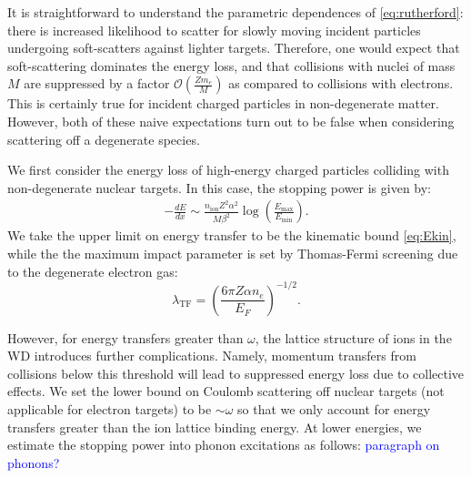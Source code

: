 \documentclass[twocolumn,showpacs,preprintnumbers,amsmath,amssymb,prd]{revtex4}
\newcommand{\OO}{\mathcal{O}}
\def\r{\right)}
\def\l{\left(}
\begin{document}
\begin{appendices}
It is straightforward to understand the parametric dependences of \eqref{eq:rutherford}: there is increased likelihood to scatter for slowly moving incident particles undergoing soft-scatters against lighter targets.
Therefore, one would expect that soft-scattering dominates the energy loss, and that collisions with nuclei of mass $M$ are suppressed by a factor $\OO\l\frac{Z m_e}{M}\r$ as compared to collisions with electrons.
This is certainly true for incident charged particles in non-degenerate matter.
However, both of these naive expectations turn out to be false when considering scattering off a degenerate species.

We first consider the energy loss of high-energy charged particles colliding with non-degenerate nuclear targets. 
In this case, the stopping power is given by:
\begin{align}
\label{eq:SP}
-  \frac{dE}{dx} \sim \frac{n_\text{ion} Z^2 \alpha^2}{M \beta^2} \log {\l\frac{E_{\text{max}}}{E_{\text{min}}}\r}.
\end{align}
We take the upper limit on energy transfer to be the kinematic bound \eqref{eq:Ekin}, while the the maximum impact parameter is set by Thomas-Fermi screening due to the degenerate electron gas:
\begin{equation}
\label{eq:TF}
\lambda_{\text{TF}} = \l \frac{6 \pi Z \alpha n_e}{E_F}\r^{-1/2}.
\end{equation}

However, for energy transfers greater than $\omega$, the lattice structure of ions in the WD introduces further complications.
Namely, momentum transfers from collisions below this threshold will lead to suppressed energy loss due to collective effects.
We set the lower bound on Coulomb scattering off nuclear targets (not applicable for electron targets) to be $\sim \omega$ so that we only account for energy transfers greater than the ion lattice binding energy.
At lower energies, we estimate the stopping power into phonon excitations as follows: \textcolor{blue}{paragraph on phonons?}


\end{appendices}
\end{document}
